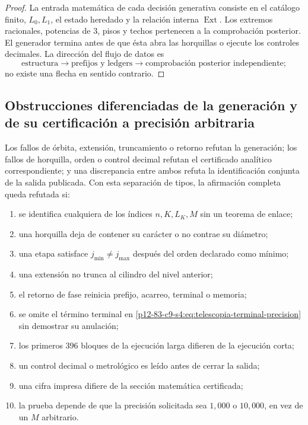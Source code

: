 \begin{proof}
La entrada matemática de cada decisión generativa consiste en el catálogo
finito, \(L_0,L_1\), el estado heredado y la relación interna
\(\operatorname{Ext}\). Los extremos racionales, potencias de \(3\), pisos y
techos pertenecen a la comprobación posterior. El generador termina antes de
que ésta abra las horquillas o ejecute los controles decimales. La dirección
del flujo de datos es
\[
 \text{estructura}\longrightarrow
 \text{prefijos y ledgers}\longrightarrow
 \text{comprobación posterior independiente};
\]
no existe una flecha en sentido contrario.
\end{proof}

\subsection{Obstrucciones diferenciadas de la generación y de su certificación a precisión arbitraria}

\begin{criterion}
Los fallos de órbita, extensión, truncamiento o retorno refutan la generación;
los fallos de horquilla, orden o control decimal refutan el certificado
analítico correspondiente; y una discrepancia entre ambos refuta la
identificación conjunta de la salida publicada. Con esta separación de tipos,
la afirmación completa queda refutada si:
\begin{enumerate}
 \item se identifica cualquiera de los índices \(n,K,L_K,M\) sin un
       teorema de enlace;
 \item una horquilla deja de contener su carácter o no contrae su diámetro;
 \item una etapa satisface \(j_{\min}\ne j_{\max}\) después del orden
       declarado como mínimo;
 \item una extensión no trunca al cilindro del nivel anterior;
 \item el retorno de fase reinicia prefijo, acarreo, terminal o memoria;
 \item se omite el término terminal en
       \eqref{p12-83-c9-s4:eq:telescopia-terminal-precision} sin demostrar su anulación;
 \item los primeros \(396\) bloques de la ejecución larga difieren de la
       ejecución corta;
 \item un control decimal o metrológico es leído antes de cerrar la salida;
 \item una cifra impresa difiere de la sección matemática certificada;
 \item la prueba depende de que la precisión solicitada sea \(1,000\) o
       \(10,000\), en vez de un \(M\) arbitrario.
\end{enumerate}
\end{criterion}
